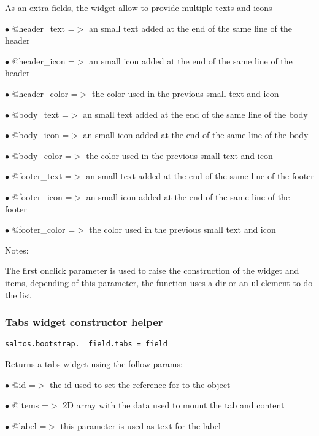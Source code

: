 \documentclass[a4paper]{article}
\begin{document}
As an extra fields, the widget allow to provide multiple texts and icons

\begin{compactitem}
\item[\color{myblue}$\bullet$] @header\_text  =$>$ an small text added at the end of the same line of the header
\item[\color{myblue}$\bullet$] @header\_icon  =$>$ an small icon added at the end of the same line of the header
\item[\color{myblue}$\bullet$] @header\_color =$>$ the color used in the previous small text and icon
\item[\color{myblue}$\bullet$] @body\_text    =$>$ an small text added at the end of the same line of the body
\item[\color{myblue}$\bullet$] @body\_icon    =$>$ an small icon added at the end of the same line of the body
\item[\color{myblue}$\bullet$] @body\_color   =$>$ the color used in the previous small text and icon
\item[\color{myblue}$\bullet$] @footer\_text  =$>$ an small text added at the end of the same line of the footer
\item[\color{myblue}$\bullet$] @footer\_icon  =$>$ an small icon added at the end of the same line of the footer
\item[\color{myblue}$\bullet$] @footer\_color =$>$ the color used in the previous small text and icon
\end{compactitem}

Notes:

The first onclick parameter is used to raise the construction of the widget and items,
depending of this parameter, the function uses a dir or an ul element to do the list

\hypertarget{toc645}{}
\subsubsection{Tabs widget constructor helper}

\begin{lstlisting}
saltos.bootstrap.__field.tabs = field
\end{lstlisting}

Returns a tabs widget using the follow params:

\begin{compactitem}
\item[\color{myblue}$\bullet$] @id    =$>$ the id used to set the reference for to the object
\item[\color{myblue}$\bullet$] @items =$>$ 2D array with the data used to mount the tab and content
\item[\color{myblue}$\bullet$] @label    =$>$ this parameter is used as text for the label
\end{compactitem}
\end{document}

